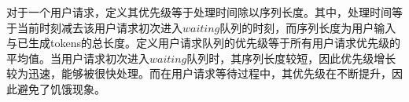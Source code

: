 对于一个用户请求，定义其优先级等于处理时间除以序列长度。其中，处理时间等于当前时刻减去该用户请求初次进入$waiting$队列的时刻，而序列长度为用户输入与已生成tokens的总长度。定义用户请求队列的优先级等于所有用户请求优先级的平均值。当用户请求初次进入$waiting$队列时，其序列长度较短，因此优先级增长较为迅速，能够被很快处理。而在用户请求等待过程中，其优先级在不断提升，因此避免了饥饿现象。 \par

